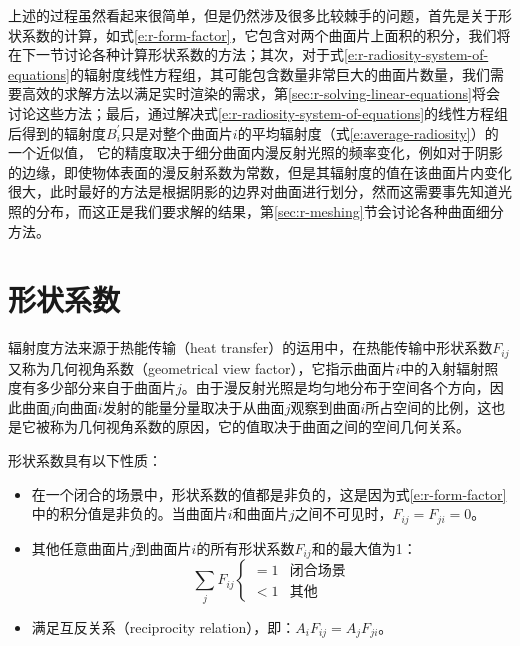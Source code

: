 上述的过程虽然看起来很简单，但是仍然涉及很多比较棘手的问题，首先是关于形状系数的计算，如式\ref{e:r-form-factor}，它包含对两个曲面片上面积的积分，我们将在下一节讨论各种计算形状系数的方法；其次，对于式\ref{e:r-radiosity-system-of-equations}的辐射度线性方程组，其可能包含数量非常巨大的曲面片数量，我们需要高效的求解方法以满足实时渲染的需求，第\ref{sec:r-solving-linear-equations}将会讨论这些方法；最后，通过解决式\ref{e:r-radiosity-system-of-equations}的线性方程组后得到的辐射度$B^{'}_{i}$只是对整个曲面片$i$的平均辐射度（式\ref{e:average-radiosity}）的一个近似值， 它的精度取决于细分曲面内漫反射光照的频率变化，例如对于阴影的边缘，即使物体表面的漫反射系数为常数，但是其辐射度的值在该曲面片内变化很大，此时最好的方法是根据阴影的边界对曲面进行划分，然而这需要事先知道光照的分布，而这正是我们要求解的结果，第\ref{sec:r-meshing}节会讨论各种曲面细分方法。





\section{形状系数}\label{sec:r-form-factors}
辐射度方法来源于热能传输（heat transfer）的运用中，在热能传输中形状系数$F_{ij}$又称为几何视角系数（geometrical view factor），它指示曲面片$i$中的入射辐射照度有多少部分来自于曲面片$j$。由于漫反射光照是均匀地分布于空间各个方向，因此曲面$j$向曲面$i$发射的能量分量取决于从曲面$j$观察到曲面$i$所占空间的比例，这也是它被称为几何视角系数的原因，它的值取决于曲面之间的空间几何关系。

形状系数具有以下性质：

\begin{itemize}
	\item 在一个闭合的场景中，形状系数的值都是非负的，这是因为式\ref{e:r-form-factor}中的积分值是非负的。当曲面片$i$和曲面片$j$之间不可见时，$F_{ij}=F_{ji}=0$。
	\item 其他任意曲面片$j$到曲面片$i$的所有形状系数$F_{ij}$和的最大值为1：
		\begin{equation}
			\sum_j F_{ij}\begin{cases}
				  =1  & \text{闭合场景}\\
			      <1  & \text{其他}  
				\end{cases}
		\end{equation}
	\item 满足互反关系（reciprocity relation），即：$A_iF_{ij}=A_jF_{ji}$。
\end{itemize}

